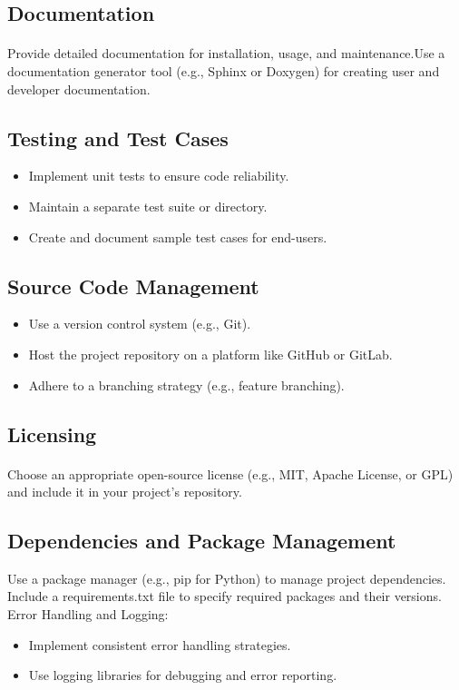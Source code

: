 \documentclass{article}
\begin{document}
\subsection{Documentation}
\paragraph{}
Provide detailed documentation for installation, usage, and maintenance.Use a
documentation generator tool (e.g., Sphinx or Doxygen) for creating user and developer
documentation.

\subsection{Testing and Test Cases}
\begin{itemize}
    \item Implement unit tests to ensure code reliability.
    \item Maintain a separate test suite or directory.
    \item Create and document sample test cases for end-users.
\end{itemize}

\subsection{Source Code Management}
\begin{itemize}
    \item Use a version control system (e.g., Git).
    \item Host the project repository on a platform like GitHub or GitLab.
    \item Adhere to a branching strategy (e.g., feature branching).
\end{itemize}

\subsection{Licensing}
\paragraph{}
Choose an appropriate open-source license (e.g., MIT, Apache License, or GPL) and
include it in your project's repository.

\subsection{Dependencies and Package Management}
Use a package manager (e.g., pip for Python) to manage project dependencies.
Include a requirements.txt file to specify required packages and their versions.
Error Handling and Logging:
\begin{itemize}
    \item Implement consistent error handling strategies.
    \item Use logging libraries for debugging and error reporting.
\end{itemize}
\end{document}
